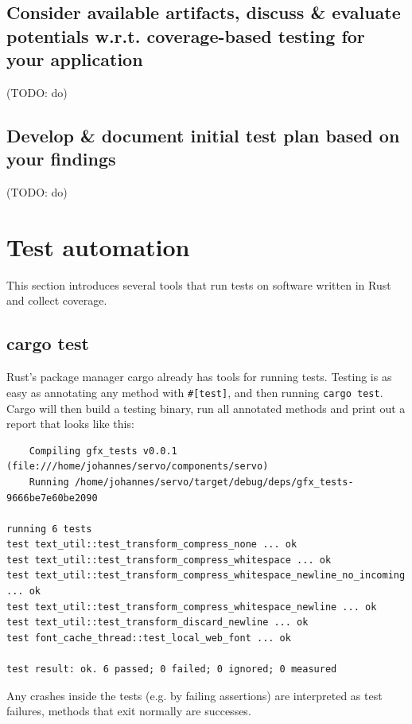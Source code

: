 \documentclass{scrartcl}
\newcommand{\todo}[1] {{\color{red}(TODO: #1)}}
\begin{document}
\subsection{Consider available artifacts, discuss \& evaluate potentials w.r.t. coverage-based testing for your application}
\todo{do}


\subsection{Develop \& document initial test plan based on your findings}
\todo{do}


\newpage


\section{Test automation}

This section introduces several tools that run tests on software written in Rust and collect coverage.

\subsection{cargo test}

Rust's package manager cargo already has tools for running tests. Testing is as easy as annotating any method with \texttt{\#[test]}, and then running \texttt{cargo test}. Cargo will then build a testing binary, run all annotated methods and print out a report that looks like this:


\small {

\begin{verbatim}
    Compiling gfx_tests v0.0.1 (file:///home/johannes/servo/components/servo)
    Running /home/johannes/servo/target/debug/deps/gfx_tests-9666be7e60be2090

running 6 tests
test text_util::test_transform_compress_none ... ok
test text_util::test_transform_compress_whitespace ... ok
test text_util::test_transform_compress_whitespace_newline_no_incoming ... ok
test text_util::test_transform_compress_whitespace_newline ... ok
test text_util::test_transform_discard_newline ... ok
test font_cache_thread::test_local_web_font ... ok

test result: ok. 6 passed; 0 failed; 0 ignored; 0 measured

\end{verbatim}
}

Any crashes inside the tests (e.g. by failing assertions) are interpreted as test failures, methods that exit normally are successes.
\end{document}
